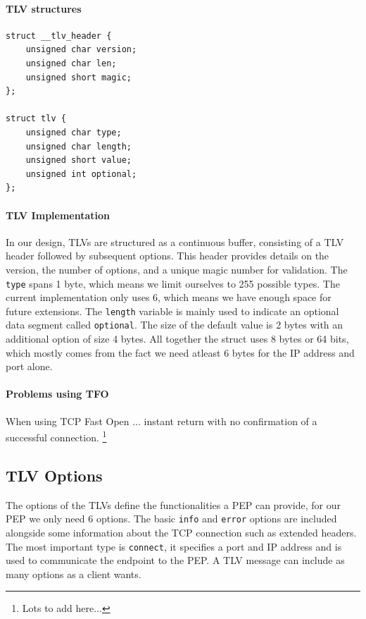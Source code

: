 \documentclass[a4paper,english, 11pt]{report}
\begin{document}
\noindent\begin{minipage}{\linewidth}
\paragraph{TLV structures}
\begin{verbatim}
struct __tlv_header {
    unsigned char version;
    unsigned char len;
    unsigned short magic;
};

struct tlv {
    unsigned char type;
    unsigned char length;
    unsigned short value;
    unsigned int optional;
};
\end{verbatim}
\end{minipage}

\paragraph{TLV Implementation}
In our design, TLVs are structured as a continuous buffer, consisting of a TLV header followed by subsequent options.  This header provides details on the version, the number of options, and a unique magic number for validation. The \verb|type| spans 1 byte, which means we limit ourselves to 255 possible types. The current implementation only uses 6, which means we have enough space for future extensions. The \verb|length| variable is mainly used to indicate an optional data segment called \verb|optional|. The size of the default value is 2 bytes with an additional option of size 4 bytes. All together the struct uses 8 bytes or 64 bits, which mostly comes from the fact we need atleast 6 bytes for the IP address and port alone. 

\paragraph{Problems using TFO}
When using TCP Fast Open ... instant return with no confirmation of a successful connection. \footnote{Lots to add here...}

\subsection{TLV Options}
The options of the TLVs define the functionalities a PEP can provide, for our PEP we only need 6 options. The basic \verb|info| and \verb|error| options are included alongside some information about the TCP connection such as extended headers. The most important type is \verb|connect|, it specifies a port and IP address and is used to communicate the endpoint to the PEP. A TLV message can include as many options as a client wants.
\end{document}

